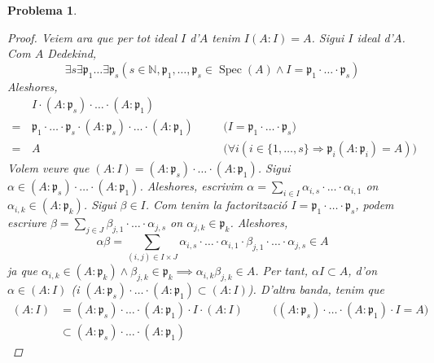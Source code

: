 \documentclass{article}
\DeclareMathOperator{\Spec}{Spec}
\newtheorem{problema}{Problema}
\begin{document}
\begin{problema}
\begin{enumerate}
\begin{proof}
            Veiem ara que per tot ideal $I$ d'$A$ tenim $I(A:I)=A$. Sigui $I$ ideal d'$A$. Com $A$ Dedekind,
            \begin{equation*}
                \exists s\exists\mathfrak{p}_{1}\ldots\exists\mathfrak{p}_{s}(s\in\mathbb{N},\mathfrak{p}_{1},\ldots,\mathfrak{p}_{s}\in\Spec(A)\land I=\mathfrak{p}_{1}\cdot\ldots\cdot\mathfrak{p}_{s})
            \end{equation*}
            Aleshores,
            \begin{align*}
                &I\cdot(A:\mathfrak{p}_{s})\cdot\ldots\cdot(A:\mathfrak{p}_{1})\\
                =\,
                &\mathfrak{p}_{1}\cdot\ldots\cdot\mathfrak{p}_{s}\cdot(A:\mathfrak{p}_{s})\cdot\ldots\cdot(A:\mathfrak{p}_{1})
                &\quad&\textrm{($I=\mathfrak{p}_{1}\cdot\ldots\cdot\mathfrak{p}_{s}$)}\\
                =\,
                &A
                &\quad&\textrm{($\forall i(i\in\{1,\ldots,s\}\Rightarrow\mathfrak{p}_{i}(A:\mathfrak{p}_{i})=A)$)}
            \end{align*}
            Volem veure que $(A:I)=(A:\mathfrak{p}_{s})\cdot\ldots\cdot(A:\mathfrak{p}_{1})$. Sigui $\alpha\in(A:\mathfrak{p}_{s})\cdot\ldots\cdot(A:\mathfrak{p}_{1})$. Aleshores, escrivim $\alpha=\sum_{i\in I}\alpha_{i,s}\cdot\ldots\cdot\alpha_{i,1}$ on $\alpha_{i,k}\in(A:\mathfrak{p}_{k})$. Sigui $\beta\in I$. Com tenim la factorització $I=\mathfrak{p}_{1}\cdot\ldots\cdot\mathfrak{p}_{s}$, podem escriure $\beta=\sum_{j\in J}\beta_{j,1}\cdot\ldots\cdot\alpha_{j,s}$ on $\alpha_{j,k}\in\mathfrak{p}_{k}$. Aleshores,
            \begin{equation*}
                \alpha\beta=\sum_{(i,j)\in I\times J}\alpha_{i,s}\cdot\ldots\cdot\alpha_{i,1}\cdot\beta_{j,1}\cdot\ldots\cdot\alpha_{j,s}\in A
            \end{equation*}
            ja que $\alpha_{i,k}\in(A:\mathfrak{p}_{k})\land\beta_{j,k}\in\mathfrak{p}_{k}\implies\alpha_{i,k}\beta_{j,k}\in A$. Per tant, $\alpha I\subset A$, d'on $\alpha\in(A:I)$ (i $(A:\mathfrak{p}_{s})\cdot\ldots\cdot(A:\mathfrak{p}_{1})\subset(A:I)$). D'altra banda, tenim que
            \begin{align*}
                (A:I)
                &=(A:\mathfrak{p}_{s})\cdot\ldots\cdot(A:\mathfrak{p}_{1})\cdot I\cdot(A:I)
                &\quad&\textrm{($(A:\mathfrak{p}_{s})\cdot\ldots\cdot(A:\mathfrak{p}_{1})\cdot I=A$)}\\
                &\subset(A:\mathfrak{p}_{s})\cdot\ldots\cdot(A:\mathfrak{p}_{1})

\end{align*}
\end{proof}
\end{enumerate}
\end{problema}
\end{document}
